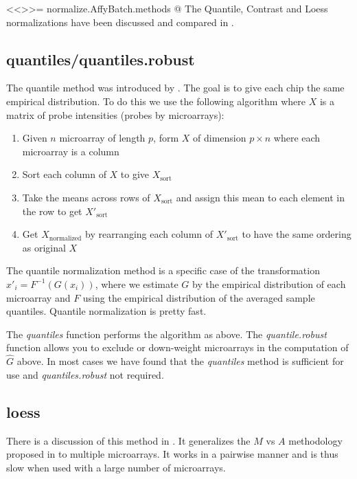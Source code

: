<<>>=
normalize.AffyBatch.methods
@
The Quantile, Contrast and Loess normalizations have been discussed and compared in \cite{PMID_12538238}.

\subsection{quantiles/quantiles.robust}

The quantile method was introduced by \cite{PMID_12538238}. The goal is to give each chip the same empirical distribution. To do this we use the following algorithm where $X$ is a matrix of probe intensities (probes by microarrays):

\begin{enumerate}
\item Given $n$ microarray of length $p$, form $X$  of dimension $p \times n$  where
each microarray is a column
\item Sort each column of $X$ to give $X_{\mbox{sort}}$
\item Take the means across rows of $X_{\mbox{sort}}$ and assign this mean to each element in the row to get $X'_{\mbox{sort}}$
\item Get $X_{\mbox{normalized}}$ by rearranging each column of $X'_{\mbox{sort}}$ to have the same ordering as original $X$
\end{enumerate}

The quantile normalization method is a specific case of the transformation $x'_{i} = F^{-1}\left(G\left(x_{i}\right)\right)$, where we estimate $G$ by the empirical distribution of each microarray and $F$ using the empirical distribution of the averaged sample quantiles.  Quantile normalization is pretty fast.

The \emph{quantiles} function performs the algorithm as above. The \emph{quantile.robust} function allows you to exclude or down-weight microarrays in the computation of $\hat G$ above. In most cases we have found that the \emph{quantiles} method is sufficient for use and \emph{quantiles.robust} not required.

\subsection{loess}

There is a discussion of this method in \cite{PMID_12538238}. It generalizes the $M$ vs $A$ methodology proposed in \cite{Dudoit:2002} to multiple microarrays. It works in a pairwise manner and is thus slow when used with a large number of microarrays.

